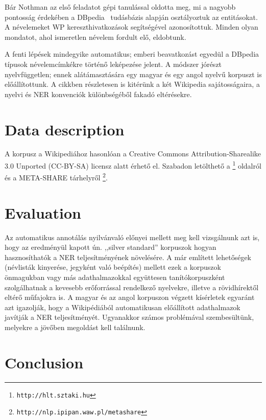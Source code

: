 \documentclass{llncs}
\begin{document}
Bár Nothman az első feladatot gépi tanulással oldotta meg, mi a nagyobb
pontosság érdekében a DBpedia~\cite{Bizer:09} tudásbázis alapján osztályoztuk az
entitásokat. A névelemeket WP kereszthivatkozások segítségével azonosítottuk. Minden
olyan mondatot, ahol ismeretlen névelem fordult elő, eldobtunk.

A fenti lépések mindegyike automatikus; emberi beavatkozást egyedül a DBpedia típusok
névelemcímkékre történő leképezése jelent. A módszer jórészt nyelvfüggetlen; ennek
alátámasztására egy magyar és egy angol nyelvű korpuszt is előállítottunk. A cikkben
részletesen is kitérünk a két Wikipedia sajátosságaira, a nyelvi és NER konvenciók
különbségéből fakadó eltérésekre.

\section{Data description}

A korpusz a Wikipediához hasonlóan a Creative Commons Attribution-Sharealike
3.0 Unported (CC-BY-SA) licensz alatt érhető el. Szabadon letölthető a
\footnote{\texttt{http://hlt.sztaki.hu}} oldalról és a META-SHARE tárhelyről
\footnote{\texttt{http://nlp.ipipan.waw.pl/metashare}}.

\section{Evaluation}

Az automatikus annotálás nyilvánvaló előnyei mellett meg kell vizsgálnunk azt is, hogy az eredményül kapott  ún. ,,silver standard'' korpuszok hogyan hasznosíthatók a NER teljesítményének növelésére. A már említett lehetőségek (névlisták kinyerése, jegyként való beépítés) mellett ezek a korpuszok önmagukban vagy más adathalmazokkal együttesen tanítókorpuszként szolgálhatnak a kevesebb erőforrással rendelkező nyelvekre, illetve a rövidhírektől eltérő műfajokra is. A magyar és az angol korpuszon végzett kísérletek egyaránt azt igazolják, hogy a Wikipédiából automatikusan előállított adathalmazok javítják a NER teljesítményét. Ugyanakkor számos problémával szembesültünk, melyekre a jövőben megoldást kell találnunk. 

\section{Conclusion}

\cite{Nothman:08} \cite{Szarvas:06} \cite{Medelyan:09}

%
%


\end{document}
